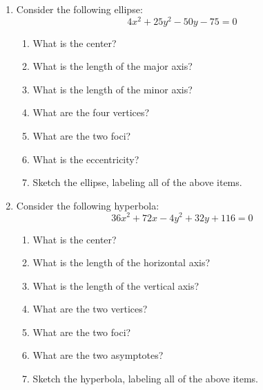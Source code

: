 \documentclass[letterpaper,12pt,fleqn]{article}
\begin{document}
\begin{enumerate}
\item Consider the following ellipse:
  \[4x^2+25y^2-50y-75=0\]
  \begin{enumerate}
  \item What is the center?
  \item What is the length of the major axis?
  \item What is the length of the minor axis?
  \item What are the four vertices?
  \item What are the two foci?
  \item What is the eccentricity?
  \item Sketch the ellipse, labeling all of the above items.
  \end{enumerate}
\newpage
\item Consider the following hyperbola:
  \[36x^2+72x-4y^2+32y+116=0\]
  \begin{enumerate}
  \item What is the center?
  \item What is the length of the horizontal axis?
  \item What is the length of the vertical axis?
  \item What are the two vertices?
  \item What are the two foci?
  \item What are the two asymptotes?
  \item Sketch the hyperbola, labeling all of the above items.
  \end{enumerate}
\end{enumerate}
\end{document}
